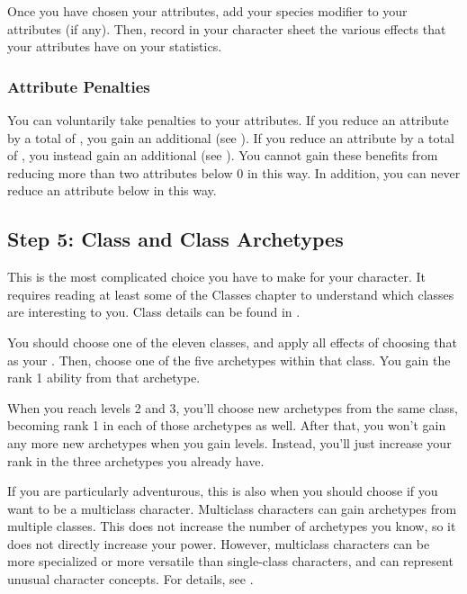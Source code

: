     Once you have chosen your attributes, add your species modifier to your attributes (if any).
    Then, record in your character sheet the various effects that your attributes have on your statistics.

    \subsubsection{Attribute Penalties}\label{Attribute Penalties}
      You can voluntarily take penalties to your attributes.
      If you reduce an attribute by a total of , you gain an additional  (see ).
      If you reduce an attribute by a total of , you instead gain an additional  (see ).
      You cannot gain these benefits from reducing more than two attributes below 0 in this way.
      In addition, you can never reduce an attribute below  in this way.

  \subsection{Step 5: Class and Class Archetypes}
    This is the most complicated choice you have to make for your character.
    It requires reading at least some of the Classes chapter to understand which classes are interesting to you.
    Class details can be found in .

    You should choose one of the eleven classes, and apply all effects of choosing that as your .
    Then, choose one of the five archetypes within that class.
    You gain the rank 1 ability from that archetype.

    When you reach levels 2 and 3, you'll choose new archetypes from the same class, becoming rank 1 in each of those archetypes as well.
    After that, you won't gain any more new archetypes when you gain levels.
    Instead, you'll just increase your rank in the three archetypes you already have.

    If you are particularly adventurous, this is also when you should choose if you want to be a multiclass character.
    Multiclass characters can gain archetypes from multiple classes.
    This does not increase the number of archetypes you know, so it does not directly increase your power.
    However, multiclass characters can be more specialized or more versatile than single-class characters, and can represent unusual character concepts.
    For details, see .

